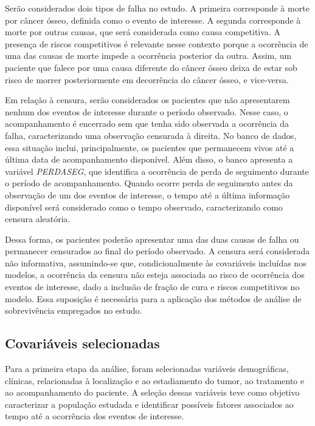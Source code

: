 \documentclass[11pt,a4paper]{article}
\begin{document}
Serão considerados dois tipos de falha no estudo. A primeira corresponde à morte por câncer ósseo, definida como o evento de interesse. A segunda corresponde à morte por outras causas, que será considerada como causa competitiva. A presença de riscos competitivos é relevante nesse contexto porque a ocorrência de uma das causas de morte impede a ocorrência posterior da outra. Assim, um paciente que falece por uma causa diferente do câncer ósseo deixa de estar sob risco de morrer posteriormente em decorrência do câncer ósseo, e vice-versa.

Em relação à censura, serão considerados os pacientes que não apresentarem nenhum dos eventos de interesse durante o período observado. Nesse caso, o acompanhamento é encerrado sem que tenha sido observada a ocorrência da falha, caracterizando uma observação censurada à direita. No banco de dados, essa situação inclui, principalmente, os pacientes que permanecem vivos até a última data de acompanhamento disponível. Além disso, o banco apresenta a variável \textit{PERDASEG}, que identifica a ocorrência de perda de seguimento durante o período de acompanhamento. Quando ocorre perda de seguimento antes da observação de um dos eventos de interesse, o tempo até a última informação disponível será considerado como o tempo observado, caracterizando como censura aleatória.

Dessa forma, os pacientes poderão apresentar uma das duas causas de falha ou permanecer censurados ao final do período observado. A censura será considerada não informativa, assumindo-se que, condicionalmente às covariáveis incluídas nos modelos, a ocorrência da censura não esteja associada ao risco de ocorrência dos eventos de interesse, dado a inclusão de fração de cura e riscos competitivos no modelo. Essa suposição é necessária para a aplicação dos métodos de análise de sobrevivência empregados no estudo.


\subsection{Covariáveis selecionadas}

Para a primeira etapa da análise, foram selecionadas variáveis demográficas, clínicas, relacionadas à localização e ao estadiamento do tumor, ao tratamento e ao acompanhamento do paciente. A seleção dessas variáveis teve como objetivo caracterizar a população estudada e identificar possíveis fatores associados ao tempo até a ocorrência dos eventos de interesse. 
\end{document}
